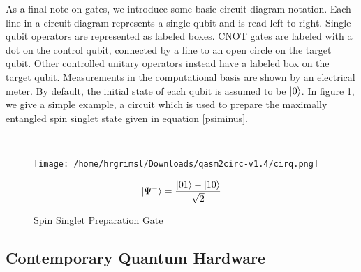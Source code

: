 \documentclass{article}
\begin{document}
\begin{paragraph}{}
As a final note on gates, we introduce some basic circuit diagram notation.  Each line in a circuit diagram represents a single qubit and is read left to right. Single qubit operators are represented as labeled boxes.  CNOT gates are labeled with a dot on the control qubit, connected by a line to an open circle on the target qubit.  Other controlled unitary operators instead have a labeled box on the target qubit.  Measurements in the computational basis are shown by an electrical meter.  By default, the initial state of each qubit is assumed to be $\ket{0}$.  In figure \ref{fig:circuit}, we give a simple example, a circuit which is used to prepare the maximally entangled spin singlet state given in equation \ref{psiminus}. \cite{nielsen}
\end{paragraph}\\
\begin{figure}[h]
\begin{minipage}{.5\textwidth}
\begin{center}
\texttt{[image: /home/hrgrimsl/Downloads/qasm2circ-v1.4/cirq.png]}\caption{Spin Singlet Preparation Gate}\label{fig:circuit}
\end{center}
\end{minipage}%
\begin{minipage}{.5\textwidth}
\begin{equation}\label{psiminus} 
{\ket{\Psi^-}=\frac{\ket{01}-\ket{10}}{\sqrt{2}}}
\end{equation}
\end{minipage}%
\end{figure}
\subsection{Contemporary Quantum Hardware}
\end{document}
